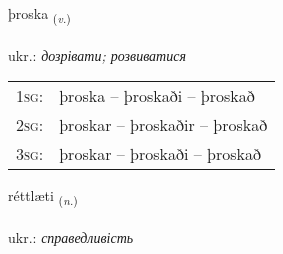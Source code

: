 \documentclass[frontgrid, backgrid]{flacards}\usepackage[]{graphicx}\usepackage[]{xcolor}
\begin{document}
\renewcommand{\flhead}{\vskip5pt \fboxsep=0pt {\small\bfseries\footnotesize Sagnorð | дієслово}}
\renewcommand{\fcfoot}{\vskip5pt \fboxsep=0pt \hspace{2pt}{\small\bfseries\footnotesize 3K}}

\renewcommand{\blhead}{\vskip5pt {\small\bfseries\footnotesize Sagnorð | дієслово }}
\renewcommand{\bcfoot}{\vskip5pt \hspace{2pt}{\small\bfseries\footnotesize 3K}}


{þroska \small{\textsubscript{(\textit{v.})}} \\[1ex] %
\textphonetic{[θrɔska]} \\
ukr.: \emph{дозрівати; розвиватися} \\  [2ex]
\renewcommand*{\arraystretch}{0.8}
\begin{tabular}{p{1cm}l}
\textsc{1sg}: & þroska -- þroskaði -- þroskað \\ 
\textsc{2sg}: & þroskar -- þroskaðir -- þroskað \\ 
\textsc{3sg}: & þroskar -- þroskaði -- þroskað \\ 
\end{tabular}
}

\renewcommand{\flhead}{\vskip5pt \fboxsep=0pt {\small\bfseries\footnotesize Nafnorð | іменник}}
\renewcommand{\fcfoot}{\vskip5pt \fboxsep=0pt \hspace{2pt}{\small\bfseries\footnotesize 3K}}

\renewcommand{\blhead}{\vskip5pt {\small\bfseries\footnotesize Nafnorð | іменник }}
\renewcommand{\bcfoot}{\vskip5pt \hspace{2pt}{\small\bfseries\footnotesize 3K}}


{réttlæti \small{\textsubscript{(\textit{n.})}} \\[1ex] %
\textphonetic{[rjɛhtlaitɪ]} \\
ukr.: \emph{справедливість} \\  [2ex]
\renewcommand*{\arraystretch}{0.8}
}
\end{document}
